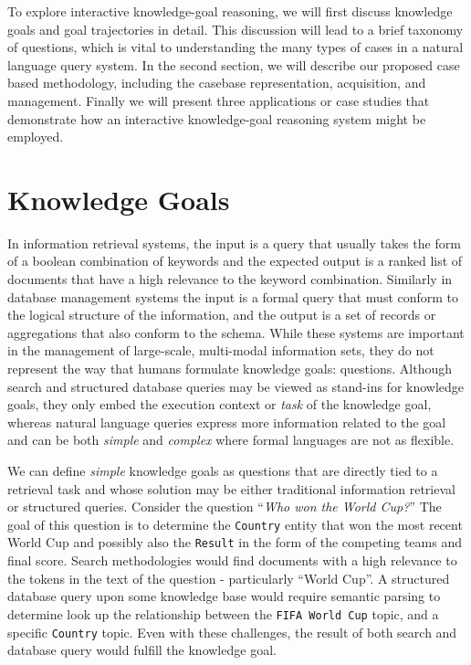 \documentclass[11pt,letterpaper]{article}
\begin{document}
To explore interactive knowledge-goal reasoning, we will first discuss knowledge goals and goal trajectories in detail. This discussion will lead to a brief taxonomy of questions, which is vital to understanding the many types of cases in a natural language query system. In the second section, we will describe our proposed case based methodology, including the casebase representation, acquisition, and management. Finally we will present three applications or case studies that demonstrate how an interactive knowledge-goal reasoning system might be employed.

\section{Knowledge Goals}

In information retrieval systems, the input is a query that usually takes the form of a boolean combination of keywords and the expected output is a ranked list of documents that have a high relevance to the keyword combination. Similarly in database management systems the input is a formal query that must conform to the logical structure of the information, and the output is a set of records or aggregations that also conform to the schema. While these systems are important in the management of large-scale, multi-modal information sets, they do not represent the way that humans formulate knowledge goals: questions. Although search and structured database queries may be viewed as stand-ins for knowledge goals, they only embed the execution context or \textit{task} of the knowledge goal, whereas natural language queries express more information related to the goal and can be both \textit{simple} and \textit{complex} where formal languages are not as flexible.

We can define \textit{simple} knowledge goals as questions that are directly tied to a retrieval task and whose solution may be either traditional information retrieval or structured queries. Consider the question ``\textit{Who won the World Cup?}'' The goal of this question is to determine the \texttt{Country} entity that won the most recent World Cup and possibly also the \texttt{Result} in the form of the competing teams and final score. Search methodologies would find documents with a high relevance to the tokens in the text of the question - particularly ``World Cup''. A structured database query upon some knowledge base would require semantic parsing to determine look up the relationship between the \texttt{FIFA World Cup} topic, and a specific \texttt{Country} topic. Even with these challenges, the result of both search and database query would fulfill the knowledge goal.
\end{document}
